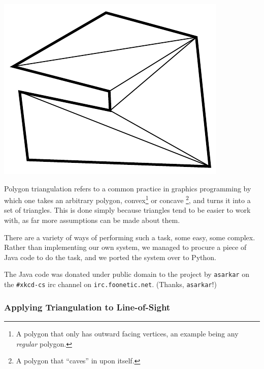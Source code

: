 \documentclass[letterpaper, 12pt]{article}
\begin{document}
\begin{multicols}{2}
\includegraphics[width=\columnwidth]{img/triangulation.pdf}

Polygon triangulation refers to a common practice in graphics programming by
which one takes an arbitrary polygon, convex\footnote{A polygon that only has
outward facing vertices, an example being any \textit{regular} polygon.} or
concave \footnote{A polygon that ``caves'' in upon itself.}, and turns it into a
set of triangles. This is done simply because triangles tend to be easier to
work with, as far more assumptions can be made about them.
\cite{wikitriangulation}

There are a variety of ways of performing such a task, some easy, some complex.
Rather than implementing our own system, we managed to procure a piece of Java
code to do the task, and we ported the system over to Python.

The Java code was donated under public domain to the project by \texttt{asarkar}
on the \texttt{\#xkcd-cs} irc channel on \texttt{irc.foonetic.net}. (Thanks,
\texttt{asarkar}!)

\subsubsection{Applying Triangulation to Line-of-Sight}


\end{multicols}
\end{document}
